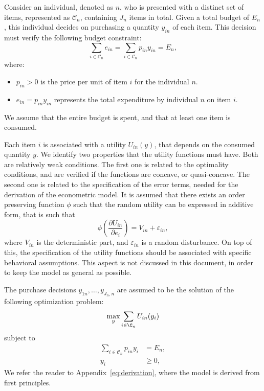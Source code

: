 \documentclass[12pt,a4paper]{article}
\begin{document}
Consider an individual, denoted as $n$, who is presented with a
distinct set of items, represented as $\mathcal{C}_n$, containing
$J_n$ items in total. Given a total budget of $E_n$, this individual
decides on purchasing a quantity $y_{in}$ of each item. This decision
must verify the following budget constraint:
\[
\sum_{i \in \mathcal{C}_n} e_{in} = \sum_{i \in \mathcal{C}_n} p_{in} y_{in} = E_n,
\]
where:
\begin{itemize}
    \item $p_{in} > 0$ is the price per unit of item $i$ for the individual $n$.
    \item $e_{in} = p_{in} y_{in}$ represents the total expenditure by individual $n$ on item $i$.
\end{itemize}
We assume that the entire budget is spent, and that at least one item is consumed.

Each item $i$ is associated with a utility $U_{in}(y)$, that depends
on the consumed quantity $y$.  We identify two
properties that the utility functions must have. Both are relatively
weak conditions. The first one is related to the optimality
conditions, and are verified if the functions are concave, or
quasi-concave. The second one is related to the specification of the
error terms, needed for the derivation of the econometric model.
It is assumed that there exists an order preserving function $\phi$ such that the random utility can be expressed in additive form, that is such that
\begin{equation}
\phi\left(\frac{\partial U_{in}}{\partial e_i}\right) = V_{in} + \varepsilon_{in},
\end{equation}
where $V_{in}$ is the deterministic part, and $\varepsilon_{in}$ is a random disturbance.
On
top of this, the specification of the utility functions should be
associated with specific behavioral assumptions. This aspect is not discussed in this document, in order to keep the model as general as possible. 

The purchase decisions $y_{1n}, \ldots, y_{J_n, n}$ are assumed to be the solution of the following optimization problem:
\begin{equation}
\max_{y} \sum_{i \in \C_n} U_{in}(y_i)
\end{equation}
subject to
\begin{align}
  \sum_{i \in \mathcal{C}_n} p_{in} y_{i} &= E_n,\\
 y_{i} &\geq 0,
\end{align}
We refer the reader to Appendix~\ref{eq:derivation}, where the model is derived from first principles.
\end{document}
